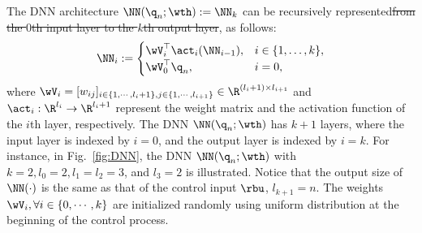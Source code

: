 \documentclass[letterpaper, journal]{IEEEtran}
\providecommand{\DIFadd}[1]{{\protect\color{blue}\uwave{#1}}} %
\providecommand{\DIFdel}[1]{{\protect\color{red}\sout{#1}}} %
\providecommand{\DIFaddbegin}{} %
\providecommand{\DIFaddend}{} %
\providecommand{\DIFdelbegin}{} %
\providecommand{\DIFdelend}{} %
\begin{document}
The DNN architecture \DIFdelbegin \DIFdel{$\NN({\q}_n;\wth) := \NN_k$ }\DIFdelend \DIFaddbegin \DIFadd{$\NN({\q}_n;\wth) = \NN_k$ }\DIFaddend can be recursively represented\DIFdelbegin \DIFdel{from the $0$th input layer to the $k$th output layer}\DIFdelend , as follows:
\begin{equation}
    \NN_i :=
    \begin{cases}
        \wV_i^\top \act_i(\NN_{i-1}), 
        &
        i\in\{1,\dots ,k\},
        \\
        \wV_0^\top {\q}_n,
        &
        i=0
        ,
    \end{cases}
    \label{eq:DNN:architecture}
\end{equation}
where $\wV_i=[w_{ij}]_{i\in\{1,\cdots,l_i+1\},j\in\{1,\cdots,l_{i+1}\}}\in\R^{(l_i+1)\times l_{i+1}}$ and $\act_i: \R^{l_i}\to\R^{l_i+1}$ represent the weight matrix and the activation function of the $i$th layer, respectively.
The DNN $\NN({\q}_n;\wth)$ has $k+1$ layers, where the input layer is indexed by $i=0$, and the output layer is indexed by $i=k$.
For instance, in Fig.~\ref{fig:DNN}, the DNN $\NN({\q}_n;\wth)$ with $k=2,l_0=2,l_1=l_2=3$, and $l_3=2$ is illustrated.
Notice that the output size of $\NN(\cdot)$ is the same as that of the control input $\rbu$, \ie $l_{k+1}=n$. 
The weights \DIFdelbegin \DIFdel{$\wV_i,\forall i\in\{0,\cdots,k\}$ }\DIFdelend \DIFaddbegin \DIFadd{$\wV_i,\ \forall i\in\{0,\cdots,k\}$, }\DIFaddend are initialized randomly using uniform distribution at the beginning of the control process.
\end{document}
